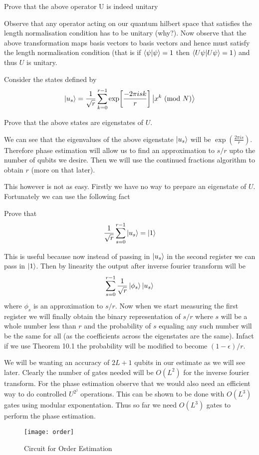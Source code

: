 \begin{exercise}
Prove that the above operator U is indeed unitary
\end{exercise}
\begin{solution}
Observe that any operator acting on our quantum hilbert space that satisfies the length normalisation condition has to be unitary (why?).
Now observe that the above transformation maps basis vectors to basis vectors and hence must satisfy the length normalisation condition (that is if $\braket{\psi}{\psi} = 1$ then $\braket{U\psi}{U\psi} = 1$) and thus $U$ is unitary.
\end{solution}

Consider the states defined by
$$ \ket{u_s} = \frac{1}{\sqrt{r}} \sum_{k=0}^{r-1} \exp[\frac{-2\pi isk}{r}] \ket{x^k\ (\mathrm{mod}\ N)}$$
\begin{exercise}
Prove that the above states are eigenstates of $U$.
\end{exercise}

We can see that the eigenvalues of the above eigenstate $\ket{u_s}$ will be $\exp(\frac{2\pi is}{r})$. Therefore phase estimation will allow us to find an approximation to $s/r$ upto the number of qubits we desire. Then we will use the continued fractions algorithm to obtain $r$ (more on that later).

This however is not as easy. Firstly we have no way to prepare an eigenstate of $U$. Fortunately we can use the following fact
\begin{exercise}
Prove that $$\frac{1}{\sqrt{r}} \sum_{s=0}^{r-1} \ket{u_s} = \ket{1}$$
\end{exercise}

This is useful because now instead of passing in $\ket{u_s}$ in the second register we can pass in $\ket{1}$. Then by linearity the output after inverse fourier transform will be 
$$ \sum_{s=0}^{r-1} \frac{1}{\sqrt{r}}\ket{\phi_s}\ket{u_s} $$ where $\phi_s$ is an approximation to $s/r$. Now when we start measuring the first register we will finally obtain the binary representation of $s/r$ where $s$ will be a whole number less than $r$ and the probability of $s$ equaling any such number will be the same for all (as the coefficients across the eigenstates are the same). Infact if we use Theorem 10.1 the probability will be modified to become $\left ( 1 -\epsilon \right)/r$.

We will be wanting an accuracy of $2L + 1$ qubits in our estimate as we will see later. Clearly the number of gates needed will be $O(L^2)$ for the inverse fourier transform. For the phase estimation observe that we would also need an efficient way to do controlled $U^{2^j}$ operations. This can be shown to be done with $O(L^3)$ gates using modular exponentation. Thus so far we need $O(L^3)$ gates to perform the phase estimation.
\begin{figure}[htp]
    \centering
    \caption{Circuit for Order Estimation}
    \texttt{[image: order]}
\end{figure}


